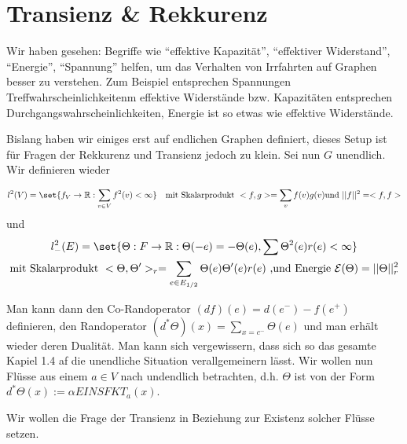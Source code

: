\section{Transienz \& Rekkurenz}

Wir haben gesehen: Begriffe wie \enquote{effektive Kapazität}, \enquote{effektiver Widerstand}, \enquote{Energie}, \enquote{Spannung} helfen, um das Verhalten von Irrfahrten auf Graphen besser zu verstehen. Zum Beispiel entsprechen Spannungen Treffwahrscheinlichkeitenm effektive Widerstände bzw. Kapazitäten entsprechen Durchgangswahrscheinlichkeiten, Energie ist so etwas wie effektive Widerstände.

Bislang haben wir einiges erst auf endlichen Graphen definiert, dieses Setup ist für Fragen der Rekkurenz und Transienz jedoch zu klein. Sei nun $G$ unendlich. Wir definieren wieder

\begin{align}
	l^2(V) = \set{f_V \to \Real: \sum\limits_{v\in V} f^2(v)<\infty } && \text{mit Skalarprodukt } <f,g> = \sum\limits_{v} f(v)g(v) \text{und } ||f||^2 = <f,f>
\end{align}
und
\begin{gather}
	l^2_-(E) = \set{\Theta:F \to \Real: \Theta(-e) = -\Theta(e), \sum \Theta^2(e)r(e) < \infty} \\
	 \text{mit Skalarprodukt } <\Theta, \Theta'>_r = \sum\limits_{e \in E_{1/2}} \Theta(e)\Theta'(e)r(e) \text{ ,und Energie } \mathcal{E}(\Theta) = ||\Theta||^2_r
\end{gather}

Man kann dann den Co-Randoperator $(df)(e)= d(e^-) - f(e^+)$ definieren, den Randoperator $(d^*\Theta)(x) = \sum\limits_{x = c^-}\Theta(e)$ und man erhält wieder deren Dualität. Man kann sich vergewissern, dass sich so das gesamte Kapiel 1.4  af die unendliche Situation verallgemeinern lässt. Wir wollen nun Flüsse aus einem $a \in V$ nach undendlich betrachten, d.h. $\Theta$ ist von der Form $d^*\Theta(x) := \alpha EINSFKT_{a}(x)$. 

Wir wollen die Frage der Transienz in Beziehung zur Existenz solcher Flüsse setzen.

